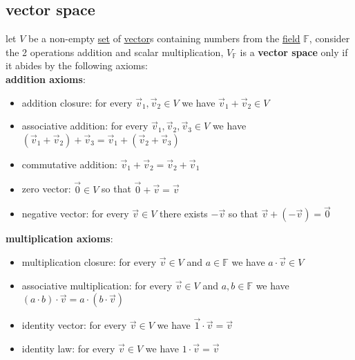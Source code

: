 \documentclass[a4paper,12pt]{article}
\begin{document}
\subsection{vector space}
\label{sec:orgea93933}
\begin{definition}
let \(V\) be a non-empty \href{discrete_maths2.org}{set} of \hyperref[sec:org103a65e]{vector}s containing numbers from the \hyperref[sec:orgd95c18e]{field} \(\mathbb{F}\), consider the 2 operations addition and scalar multiplication, \(V_\mathbb{F}\) is a \textbf{vector space} only if it abides by the following axioms:\\
\textbf{addition axioms}:\\
\begin{itemize}
\item addition closure: for every \(\vec{v}_1, \vec{v}_2 \in V\) we have \(\vec{v}_1 + \vec{v}_2 \in V\)\\
\item associative addition: for every \(\vec{v}_1, \vec{v}_2, \vec{v}_3 \in V\) we have \((\vec{v}_1 + \vec{v}_2) + \vec{v}_3 = \vec{v}_1 + (\vec{v}_2 + \vec{v}_3)\)\\
\item commutative addition: \(\vec{v}_1 + \vec{v}_2 = \vec{v}_2 + \vec{v}_1\)\\
\item zero vector: \(\vec{0} \in V\) so that \(\vec{0} + \vec{v} = \vec{v}\)\\
\item negative vector: for every \(\vec{v} \in V\) there exists \(-\vec{v}\) so that \(\vec{v} + (-\vec{v}) = \vec{0}\)\\
\end{itemize}
\textbf{multiplication axioms}:\\
\begin{itemize}
\item multiplication closure: for every \(\vec{v} \in V\) and \(a \in \mathbb{F}\) we have \(a \cdot \vec{v} \in V\)\\
\item associative multiplication: for every \(\vec{v} \in V\) and \(a,b \in \mathbb{F}\) we have \((a \cdot b) \cdot \vec{v} = a \cdot (b \cdot \vec{v})\)\\
\item identity vector: for every \(\vec{v} \in V\) we have \(\vec{1} \cdot \vec{v} = \vec{v}\)\\
\item identity law: for every \(\vec{v} \in V\) we have \(1 \cdot \vec{v} = \vec{v}\)\\

\end{itemize}
\end{definition}
\end{document}
